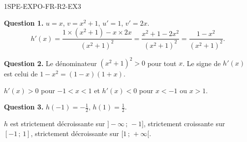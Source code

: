 \begin{corrige}{1SPE-EXPO-FR-R2-EX3}

\textbf{Question 1.} $u = x$, $v = x^2+1$, $u' = 1$, $v' = 2x$.
\[
h'(x) = \frac{1 \times (x^2+1) - x \times 2x}{(x^2+1)^2} = \frac{x^2 + 1 - 2x^2}{(x^2+1)^2} = \frac{1 - x^2}{(x^2+1)^2}.
\]

\textbf{Question 2.} Le dénominateur $(x^2+1)^2 > 0$ pour tout $x$. Le signe de $h'(x)$ est celui de $1 - x^2 = (1-x)(1+x)$.

$h'(x) > 0$ pour $-1 < x < 1$ et $h'(x) < 0$ pour $x < -1$ ou $x > 1$.


\textbf{Question 3.} $h(-1) = -\frac{1}{2}$, $h(1) = \frac{1}{2}$.

$h$ est strictement décroissante sur $]-\infty\,;\,-1]$, strictement croissante sur $[-1\,;\,1]$, strictement décroissante sur $[1\,;\,+\infty[$.

\end{corrige}
